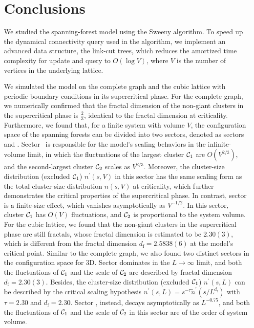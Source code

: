 \chapter{Conclusions}\label{chap:conclusion}

We studied the spanning-forest model using the Sweeny algorithm. To speed up the dynamical connectivity query 
used in the algorithm, we implement an advanced data structure, the link-cut trees, which reduces the amortized time complexity
for update and query to $O(\log V)$, where $V$ is the number of vertices in the underlying lattice. 

We simulated the model on the complete graph and the cubic lattice with periodic boundary conditions in its supercritical phase. For the complete graph,
we numerically confirmed that the fractal dimension of the non-giant clusters in the supercritical phase is $\frac{2}{3}$, identical to the fractal dimension at criticality. Furthermore, we found that, for a finite system with volume $V$, the configuration
space of the spanning forests can be divided into two sectors, denoted as sectors~ and . 
Sector~ is responsible for the model's scaling behaviors in the infinite-volume limit, in which 
the fluctuations of the largest cluster ${\mathcal C}_1$ are $O(V^{2/3})$, and the second-largest cluster ${\mathcal C}_2$ scales as $V^{2/3}$. 
Moreover, the cluster-size distribution (excluded ${\mathcal C}_1$) $n^\prime(s, V)$ in this sector has the same scaling form as the
total cluster-size distribution $n(s, V)$ at criticality, which further demonstrates the critical properties of the supercritical phase.
In contrast, sector~ is a finite-size effect, which vanishes asymptotically as $V^{-1/2}$. In this sector, 
cluster ${\mathcal C}_1$ has $O(V)$ fluctuations, and ${\mathcal C}_2$ is proportional to the system volume. For the cubic lattice, 
we found that the non-giant clusters in the supercritical phase are still fractals, whose fractal dimension is estimated to be $2.30(3)$, 
which is different from the fractal dimension $d_\text{f} = 2.5838(6)$ at the model's critical point. Similar to the complete graph, 
we also found two distinct sectors in the configuration space for 3D. Sector  dominates in the $L\to\infty$ limit,
and both the fluctuations of ${\mathcal C}_1$ and the scale of ${\mathcal C}_2$ are described by fractal dimension $d_\text{f} = 2.30(3)$. Besides,
the cluster-size distribution (excluded ${\mathcal C}_1$) $n^\prime(s, L)$ can be described by the critical scaling hypothesis $n^\prime(s, L) = s^{-\tau}\tilde{n}^\prime(s/L^{d_\text{f}})$
with $\tau = 2.30$ and $d_\text{f} = 2.30$. Sector , instead, decays asymptotically as $L^{-0.75}$, and both the fluctuations of ${\mathcal C}_1$ and the scale of ${\mathcal C}_2$ in this sector
are of the order of system volume.

